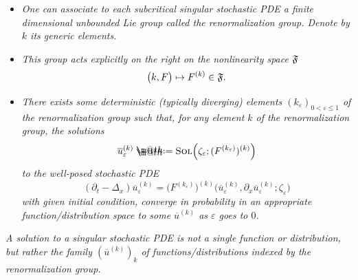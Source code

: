 \documentclass[10pt, reqno]{amsart}
\makeatletter
\numberwithin{subsection}{section}
\numberwithin{subsubsection}{subsection}
\numberwithin{equation}{section} %
\theoremstyle{mystyle}
\theoremstyle{mystyle2}
\theoremstyle{mystyle3}
\renewcommand{\epsilon}{\varepsilon}
\newcommand*{\defeq}{\mathrel{\rlap{%
                     \raisebox{0.3ex}{$\m@th\cdot$}}%
                     \raisebox{-0.3ex}{$\m@th\cdot$}}%
                     =}
\makeatother
\begin{document}
\begin{itemize}\setlength{\itemsep}{0.2cm}
   \item  \emph{One can associate to each subcritical singular stochastic 
PDE a finite dimensional unbounded Lie group called the renormalization group. Denote by $k$ its generic elements.}   %
   
   \item \emph{This group acts explicitly on the right on the nonlinearity space $\frak{F}$}
\begin{equation} \label{EqGroupAction}
\big(k,F\big)\mapsto F^{(k)}  \in \frak{F}.
\end{equation}

   \item \emph{There exists some deterministic (typically diverging) elements $(k_\epsilon)_{0<\epsilon\leq 1}$ of the renormalization group such that, for any element $k$ of the renormalization group, the solutions 
$$
\overline{u}_\epsilon^{(k)} \defeq \textsc{Sol}\Big(\zeta_\epsilon; (F^{(k_\epsilon)})^{(k)}\Big)
$$ 
to the well-posed stochastic PDE
$$
(\partial_t-\Delta_x)\overline{u}_\epsilon^{(k)} = \big(F^{(k_\epsilon)}\big)^{(k)} \big(\overline{u}_\epsilon^{(k)},\partial_x \overline{u}_\epsilon^{(k)}; \zeta_\epsilon\big)
$$ 
with given initial condition, converge in probability in an appropriate function/distribution space to some $\overline{u}^{(k)}$ as $\epsilon$ goes to $0$.}
\end{itemize} 
\vspace{0.1cm}
\emph{A solution to a singular stochastic PDE is not a single function or distribution, but rather the \emph{family} $(\overline{u}^{(k)})_k$ of functions/distributions indexed by the renormalization group.  } 

\medskip
\end{document}
